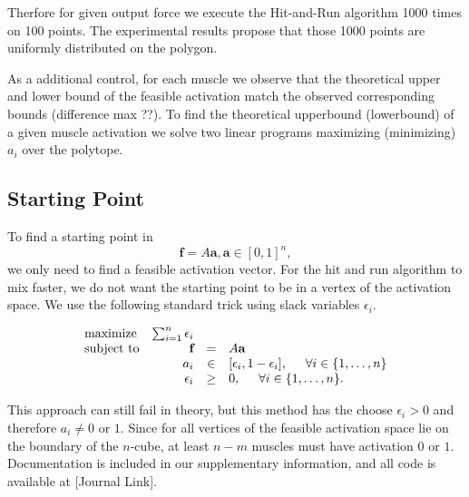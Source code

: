 Therfore for given output force we execute the Hit-and-Run algorithm 1000 times on 100 points. The experimental results propose that those 1000 points are uniformly distributed on the polygon.

As a additional control, for each muscle we observe that the theoretical upper and lower bound of the feasible activation match the observed corresponding bounds (difference max ??). To find the theoretical upperbound (lowerbound) of a given muscle activation we solve two linear programs maximizing (minimizing)  $a_i$ over the polytope.



\subsection{Starting Point}
To find a starting point in 
\[\textbf{f} = A\textbf{a}, \textbf{a} \in [0,1]^n,\]
we only need to find a feasible activation vector. For the hit and run algorithm to mix faster, we do not want the starting point to be in a vertex of the activation space. We use the following standard trick using slack variables $\epsilon_i$.

\begin{equation}\label{eq:LP_r}
\begin{array}{lrcl}
\mbox{maximize} & \sum_{i=1}^n \epsilon_i \\ 
\mbox{subject to} & \textbf{f} &=& A\textbf{a}\\
  & a_i &\in& [\epsilon_i, 1- \epsilon_i], \hspace{5mm} \forall i \in \{1,\dots,n\}  \\
  & \epsilon_i &\geq& 0, \hspace{5mm} \forall i \in \{1,\dots,n\}.  
\end{array}
\end{equation}

This approach can still fail in theory, but this method has the choose $\epsilon_i > 0$ and therefore $a_i \neq 0$ or $1$. Since for all vertices of the feasible activation space lie on the boundary of the $n$-cube, at least $n-m$ muscles must have activation $0$ or $1$. Documentation is included in our supplementary information, and all code is available at [Journal Link].

